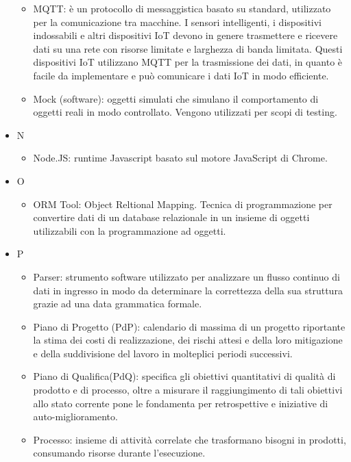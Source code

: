 \documentclass[12pt]{article}
\begin{document}
\begin{itemize}
    \begin{itemize}
        \item MQTT: è un protocollo di messaggistica basato su standard, utilizzato per la comunicazione tra macchine. I sensori intelligenti, i dispositivi indossabili e altri dispositivi IoT devono in genere trasmettere e ricevere dati su una rete con risorse limitate e larghezza di banda limitata. Questi dispositivi IoT utilizzano MQTT per la trasmissione dei dati, in quanto è facile da implementare e può comunicare i dati IoT in modo efficiente.
        \item Mock (software): oggetti simulati che simulano il comportamento di oggetti reali in modo controllato. Vengono utilizzati per scopi di testing.
    \end{itemize}
    \item[] N
    \begin{itemize}
        \item Node.JS: runtime Javascript basato sul motore JavaScript di Chrome.
    \end{itemize}
    \item[] O
    \begin{itemize}
        \item ORM Tool: Object Reltional Mapping. Tecnica di programmazione per convertire dati di un database relazionale in un insieme di oggetti utilizzabili con la programmazione ad oggetti.
    \end{itemize}
    \item[] P
    \begin{itemize}
        \item Parser: strumento software utilizzato per analizzare un flusso continuo di dati in ingresso in modo da determinare la correttezza della sua struttura grazie ad una data grammatica formale.
        \item Piano di Progetto (PdP): calendario di massima di un progetto riportante la stima dei costi di realizzazione, dei rischi attesi e della loro mitigazione e della suddivisione del lavoro in molteplici periodi successivi. 
        \item Piano di Qualifica(PdQ): specifica gli obiettivi quantitativi di qualità di prodotto e di processo, oltre a misurare il raggiungimento di tali obiettivi allo stato corrente pone le fondamenta per retrospettive e iniziative di auto-miglioramento.
        \item Processo: insieme di attività correlate che trasformano bisogni in prodotti, consumando risorse durante l'esecuzione.

\end{itemize}
\end{itemize}
\end{document}
